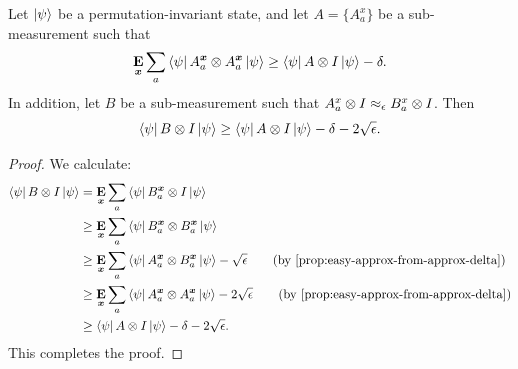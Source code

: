 \begin{proposition}\label{prop:completeness-transfer-self-consistent-A}
Let $\ket{\psi}$ be a permutation-invariant state,
and let $A = \{A^x_a\}$ be a sub-measurement such that
\begin{equation*}
\mathop{\bf E\/}_{{\boldsymbol{x}}} \sum_a \bra{\psi} A^{{\boldsymbol{x}}}_a \otimes A^{{\boldsymbol{x}}}_a \ket{\psi} \geq  \bra{\psi} A \otimes I \ket{\psi} - \delta.
\end{equation*}
In addition, let $B$ be a sub-measurement such that $A^x_a \otimes I \approx_{\epsilon} B_a^x \otimes I$.
Then
\begin{equation*}
\bra{\psi} B \otimes I \ket{\psi}
\geq \bra{\psi} A \otimes I \ket{\psi} - \delta - 2\sqrt{\epsilon}.
\end{equation*}
\end{proposition}
\begin{proof}
We calculate:
\begin{align*}
\bra{\psi} B \ot I \ket{\psi}
&= \E_{\bx} \sum_a \bra{\psi} B^{\bx}_a \ot I \ket{\psi} \\
&\geq \E_{\bx} \sum_a \bra{\psi} B^{\bx}_a \ot B^{\bx}_a \ket{\psi} \\
& \geq \E_{\bx} \sum_a \bra{\psi} A^{\bx}_a \ot B^{\bx}_a \ket{\psi} - \sqrt{\eps}
				\tag{by \Cref{prop:easy-approx-from-approx-delta}} \\
& \geq \E_{\bx} \sum_a \bra{\psi} A^{\bx}_a \ot A^{\bx}_a \ket{\psi} - 2\sqrt{\eps}
				\tag{by \Cref{prop:easy-approx-from-approx-delta}} \\
& \geq  \bra{\psi} A \ot I \ket{\psi} - \delta - 2\sqrt{\eps}.
\end{align*}
This completes the proof.
\end{proof}



